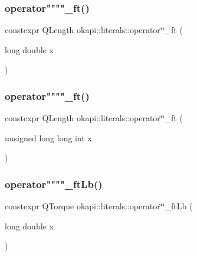 \mbox{\label{namespaceokapi_1_1literals_ae92924d9cc4e948130b70ccba8687a3a}} 
\subsubsection{\texorpdfstring{operator""""\_ft()}{operator""\_ft()}\hspace{0.1cm}{\footnotesize\ttfamily [1/2]}}
{\footnotesize\ttfamily constexpr Q\+Length okapi\+::literals\+::operator\char`\"{}\char`\"{}\+\_\+ft (\begin{DoxyParamCaption}\item[{long double}]{x }\end{DoxyParamCaption})}

\mbox{\label{namespaceokapi_1_1literals_a8343123efcfb6bee7df737f7981f4589}} 
\subsubsection{\texorpdfstring{operator""""\_ft()}{operator""\_ft()}\hspace{0.1cm}{\footnotesize\ttfamily [2/2]}}
{\footnotesize\ttfamily constexpr Q\+Length okapi\+::literals\+::operator\char`\"{}\char`\"{}\+\_\+ft (\begin{DoxyParamCaption}\item[{unsigned long long int}]{x }\end{DoxyParamCaption})}

\mbox{\label{namespaceokapi_1_1literals_ae51975f311fd3f3cc34443344f430dec}} 
\subsubsection{\texorpdfstring{operator""""\_ftLb()}{operator""\_ftLb()}\hspace{0.1cm}{\footnotesize\ttfamily [1/2]}}
{\footnotesize\ttfamily constexpr Q\+Torque okapi\+::literals\+::operator\char`\"{}\char`\"{}\+\_\+ft\+Lb (\begin{DoxyParamCaption}\item[{long double}]{x }\end{DoxyParamCaption})}

